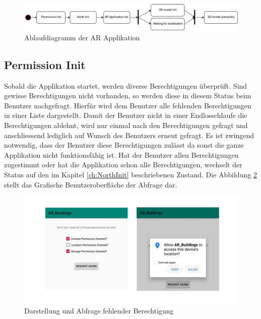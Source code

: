 \documentclass[a4paper]{scrreprt}
\begin{document}
\begin{figure}[h!]
	\includegraphics[keepaspectratio, width=\textwidth]{AblaufdiagrammARApplikation.png}
	\caption{Ablaufdiagramm der AR Applikation}
    \label{fig:Ablaufdiagramm}
\end{figure}

\subsection{Permission Init}
Sobald die Applikation startet, werden diverse Berechtigungen überprüft. Sind gewisse Berechtigungen nicht vorhanden, so werden diese in diesem Status beim Benutzer nachgefragt. Hierfür wird dem Benutzer alle fehlenden Berechtigungen in einer Liste dargestellt. Damit der Benutzer nicht in einer Endlosschlaufe die Berechtigungen ablehnt, wird nur einmal nach den Berechtigungen gefragt und anschliessend lediglich auf Wunsch des Benutzers erneut gefragt. Es ist zwingend notwendig, dass der Benutzer diese Berechtigungen zulässt da sonst die ganze Applikation nicht funktionsfähig ist. Hat der Benutzer allen Berechtigungen zugestimmt oder hat die Applikation schon alle Berechtigungen, wechselt der Status auf den im Kapitel \ref{ch:NorthInit} beschriebenen Zustand. Die Abbildung \ref{fig:PermissionInitStatus} stellt das Grafische Benutzeroberfläche der Abfrage dar.
\begin{figure}[h!]
	\includegraphics[keepaspectratio, width=\textwidth]{ARBuildingPermissionRequest.png}
	\caption{Darstellung und Abfrage fehlender Berechtigung}
    \label{fig:PermissionInitStatus}
\end{figure}
\end{document}
